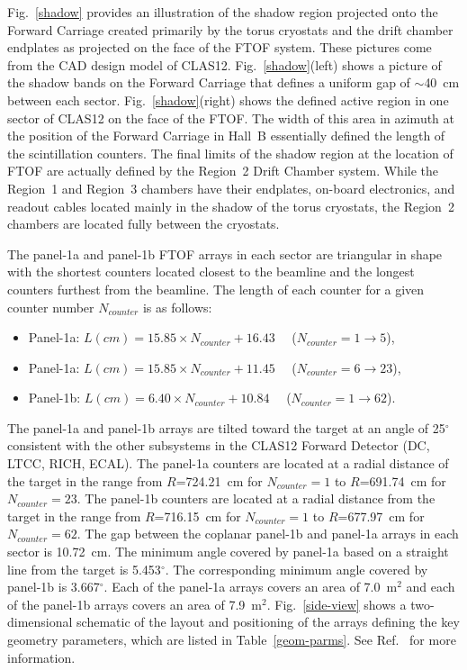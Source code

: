 \documentclass{elsart}
\begin{document}
Fig.~\ref{shadow} provides an illustration of the shadow region projected onto the Forward Carriage
created primarily by the torus cryostats and the drift chamber endplates as projected on the face of
the FTOF system. These pictures come from the CAD design model of CLAS12. Fig.~\ref{shadow}(left)
shows a picture of the shadow bands on the Forward Carriage that defines a uniform gap of $\sim$40~cm
between each sector. Fig.~\ref{shadow}(right) shows the defined active region in one sector of CLAS12 on
the face of the FTOF. The width of this area in azimuth at the position of the Forward Carriage in Hall~B
essentially defined the length of the scintillation counters. The final limits of the shadow region at the
location of FTOF are actually defined by the Region~2 Drift Chamber system.  While the Region~1 and
Region~3 chambers have their endplates, on-board electronics, and readout cables located mainly in the
shadow of the torus cryostats, the Region~2 chambers are located fully between the cryostats.

The panel-1a and panel-1b FTOF arrays in each sector are triangular in shape with the shortest counters
located closest to the beamline and the longest counters furthest from the beamline. The length of each
counter for a given counter number $N_{counter}$ is as follows:

\begin{itemize}
\item Panel-1a: $L (cm) = 15.85 \times N_{counter} + 16.43$ ~~($N_{counter} = 1 \to 5$), 
\item Panel-1a: $L (cm) = 15.85 \times N_{counter} + 11.45$ ~~($N_{counter} = 6 \to 23$), 
\item Panel-1b: $L (cm) = 6.40 \times N_{counter} + 10.84$ ~~($N_{counter} = 1 \to 62$).
\end{itemize}

The panel-1a and panel-1b arrays are tilted toward the target at an angle of 25$^{\circ}$ consistent with
the other subsystems in the CLAS12 Forward Detector (DC, LTCC, RICH, ECAL). The panel-1a counters
are located at a radial distance of the target in the range from $R$=724.21~cm for $N_{counter} = 1$ to
$R$=691.74~cm for $N_{counter} =23$. The panel-1b counters are located at a radial distance from the
target in the range from $R$=716.15~cm for $N_{counter} = 1$ to $R$=677.97~cm for $N_{counter}=62$.
The gap between the coplanar panel-1b and panel-1a arrays in each sector is 10.72~cm. The minimum angle
covered by panel-1a based on a straight line from the target is 5.453$^\circ$. The corresponding minimum
angle covered by panel-1b is 3.667$^\circ$. Each of the panel-1a arrays covers an area of 7.0~m$^2$ and
each of the panel-1b arrays covers an area of 7.9~m$^2$. Fig.~\ref{side-view} shows a two-dimensional
schematic of the layout and positioning of the arrays defining the key geometry parameters, which are
listed in Table~\ref{geom-parms}. See Ref.~\cite{ftof-geom} for more information.
\end{document}

